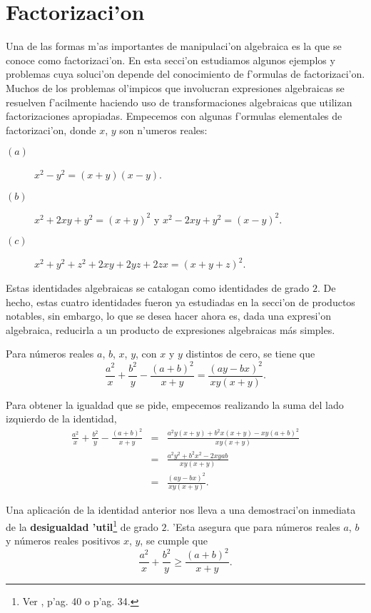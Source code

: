 
\section{Factorizaci'on}
\label{cap1sec3}

\noindent Una de las formas m'as importantes de manipulaci'on algebraica  
es la que se conoce como factorizaci'on. En esta secci'on estudiamos algunos 
ejemplos y problemas cuya soluci'on
depende del conocimiento de  f'ormulas  de factorizaci'on.
Muchos de los problemas ol'impicos que involucran expresiones algebraicas se 
resuelven f'acilmente haciendo uso de transformaciones algebraicas que 
utilizan factorizaciones apropiadas.
Empecemos con  algunas  f'ormulas  elementales de factorizaci'on, donde $x$, 
$y$ son  n'umeros reales:
\begin{description}
\item[$(a)$] $x^2 - y^2 =(x+y)(x-y)$.
\item[$(b)$]  $x^2 +2xy + y^2 = (x+y)^2$ y $x^2-2xy+y^2 = (x-y)^2$.
\item[$(c)$]  $x^2+y^2+z^2+2xy+2yz+2zx =(x+y+z)^2$.
\end{description}

\noindent Estas identidades algebraicas se catalogan como identidades de grado $2$. De hecho, estas cuatro identidades fueron ya estudiadas en la secci'on de productos notables, sin embargo, lo que se desea hacer ahora es, dada una expresi'on algebraica, reducirla a un producto de expresiones algebraicas  m\'as simples.

\vei

\begin{ejemplo} Para n\'{u}meros reales $a$, $b$, $x$, $y$, con $x$ y $y$ 
distintos de cero,  se tiene que  
$$
            \frac{a^{2}}{x}+\frac{b^{2}}{y}-\frac{(a+b)^{2}}{x+y}=\frac{(ay-bx)^{2}}{xy(x+y)}.
$$
\end{ejemplo}
Para obtener la igualdad que se pide, empecemos realizando la suma del lado izquierdo de la  identidad,
\begin{eqnarray*}
\frac{a^{2}}{x}+\frac{b^{2}}{y}-\frac{(a+b)^{2}}{x+y} & = & \frac{a^2 y (x+y)+ b^2 x (x+y) -
xy (a+b)^2}{xy(x+y)} \\
& = & \frac{a^2 y^2 + b^2 x^2 - 2xyab}{xy(x+y)}\\
& = & \frac{(ay-bx)^{2}}{xy(x+y)}.
\end{eqnarray*}

\vei

\noindent Una aplicaci\'on de la identidad anterior nos lleva a una 
demostraci'on inmediata de la {\bf desigualdad 'util}\footnote{Ver 
\cite{bulajich1}, p'ag. 40  o \cite{bulajich} p'ag. 34.} de grado $2$. 'Esta asegura que 
para n\'{u}meros reales $a$, $b$ y n\'{u}meros reales positivos $x$, $y$, 
se cumple que
$$
\frac{a^{2}}{x}+\frac{b^{2}}{y}\geq \frac{(a+b)^{2}}{x+y}.
$$

